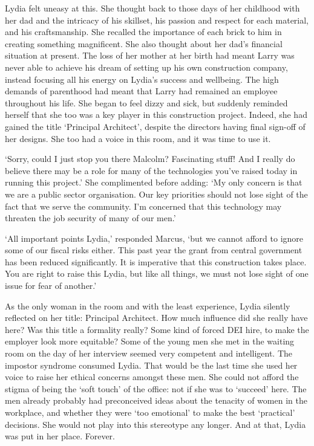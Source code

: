 Lydia felt uneasy at this. She thought back to those days of her
childhood with her dad and the intricacy of his skillset, his passion
and respect for each material, and his craftsmanship. She recalled the
importance of each brick to him in creating something magnificent. She
also thought about her dad's financial situation at present. The loss
of her mother at her birth had meant Larry was never able to achieve
his dream of setting up his own construction company, instead focusing
all his energy on Lydia's success and wellbeing. The high demands of
parenthood had meant that Larry had remained an employee throughout
his life. She began to feel dizzy and sick, but suddenly reminded
herself that she too was a key player in this construction
project. Indeed, she had gained the title `Principal Architect',
despite the directors having final sign-off of her designs. She too
had a voice in this room, and it was time to use it.

`Sorry, could I just stop you there Malcolm? Fascinating stuff! And I
really do believe there may be a role for many of the technologies
you've raised today in running this project.' She complimented before
adding: `My only concern is that we are a public sector
organisation. Our key priorities should not lose sight of the fact
that we serve the community. I'm concerned that this technology may
threaten the job security of many of our men.'

`All important points Lydia,' responded Marcus, `but we cannot afford
to ignore some of our fiscal risks either.  This past year the grant
from central government has been reduced significantly. It is
imperative that this construction takes place. You are right to raise
this Lydia, but like all things, we must not lose sight of one issue
for fear of another.'

As the only woman in the room and with the least experience, Lydia
silently reflected on her title: Principal Architect. How much
influence did she really have here? Was this title a formality really?
Some kind of forced DEI hire, to make the employer look more
equitable? Some of the young men she met in the waiting room on the
day of her interview seemed very competent and intelligent. The
impostor syndrome consumed Lydia. That would be the last time she used
her voice to raise her ethical concerns amongst these men. She could
not afford the stigma of being the `soft touch' of the office: not if
she was to `succeed' here. The men already probably had preconceived
ideas about the tenacity of women in the workplace, and whether they
were `too emotional' to make the best `practical' decisions. She would
not play into this stereotype any longer. And at that, Lydia was put
in her place. Forever.

